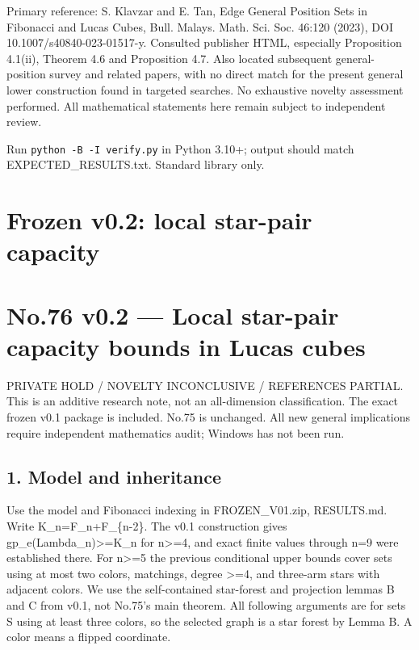 \documentclass[
  10pt,
]{article}
\begin{document}
Primary reference: S. Klavzar and E. Tan, Edge General Position Sets in
Fibonacci and Lucas Cubes, Bull. Malays. Math. Sci. Soc. 46:120 (2023),
DOI 10.1007/s40840-023-01517-y. Consulted publisher HTML, especially
Proposition 4.1(ii), Theorem 4.6 and Proposition 4.7. Also located
subsequent general-position survey and related papers, with no direct
match for the present general lower construction found in targeted
searches. No exhaustive novelty assessment performed. All mathematical
statements here remain subject to independent review.

Run \texttt{python\ -B\ -I\ verify.py} in Python 3.10+; output should
match EXPECTED\_RESULTS.txt. Standard library only.

\newpage

\section{Frozen v0.2: local star-pair
capacity}\label{frozen-v0.2-local-star-pair-capacity}

\section{No.76 v0.2 --- Local star-pair capacity bounds in Lucas
cubes}\label{no.76-v0.2-local-star-pair-capacity-bounds-in-lucas-cubes}

PRIVATE HOLD / NOVELTY INCONCLUSIVE / REFERENCES PARTIAL. This is an
additive research note, not an all-dimension classification. The exact
frozen v0.1 package is included. No.75 is unchanged. All new general
implications require independent mathematics audit; Windows has not been
run.

\subsection{1. Model and inheritance}\label{model-and-inheritance}

Use the model and Fibonacci indexing in FROZEN\_V01.zip, RESULTS.md.
Write K\_n=F\_n+F\_\{n-2\}. The v0.1 construction gives
gp\_e(Lambda\_n)\textgreater=K\_n for n\textgreater=4, and exact finite
values through n=9 were established there. For n\textgreater=5 the
previous conditional upper bounds cover sets using at most two colors,
matchings, degree \textgreater=4, and three-arm stars with adjacent
colors. We use the self-contained star-forest and projection lemmas B
and C from v0.1, not No.75's main theorem. All following arguments are
for sets S using at least three colors, so the selected graph is a star
forest by Lemma B. A color means a flipped coordinate.
\end{document}

